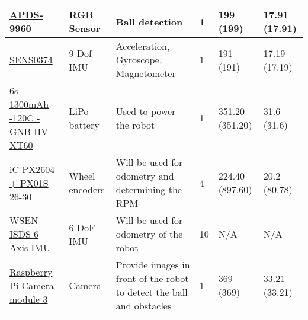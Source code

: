 \documentclass[a4paper,8pt]{article}
\begin{document}
\begin{center}
\begin{longtable}{|p{3cm}|p{3cm}|p{3cm}|p{1cm}|p{3cm}|p{3cm}|}
      \href{https://docs.broadcom.com/doc/AV02-4191EN}{APDS-9960} & RGB Sensor & Ball detection & 1 & 199 (199) & 17.91 (17.91) \\ \hline
      \href{https://wiki.dfrobot.com/BNO055_Intelligent_9_Axis_Sensor_Module_SKU_SEN0374}{SENS0374} & 9-Dof IMU & Acceleration, Gyroscope, Magnetometer & 1 & 191 (191) & 17.19 (17.19) \\ \hline
      \href{https://www.elefun.se/p/prod.aspx?v=65193}{6s 1300mAh -120C - GNB HV XT60} & LiPo-battery & Used to power the robot & 1 & 351.20 (351.20) & 31.6 (31.6)\\ \hline 
      \href{https://www.ichaus.de/product/ic-px-series/#documents}{iC-PX2604 + PX01S 26-30} & Wheel encoders & Will be used for odometry and determining the RPM & 4 & 224.40 (897.60) & 20.2 (80.78) \\ \hline 
      \href{https://www.we-online.com/components/products/datasheet/2536030320001.pdf}{WSEN-ISDS 6 Axis IMU} & 6-DoF IMU & Will be used for odometry of the robot & 10 & N/A & N/A\\ \hline 
      \href{https://www.electrokit.com/upload/product/41020/41020240/Camera_Module_3_Product_Brief.pdf}{Raspberry Pi Camera-module 3} & Camera & Provide images in front of the robot to detect the ball and obstacles & 1 & 369 (369) & 33.21 (33.21)\\ \hline 
    \end{longtable}
  \end{center}
\end{document}
